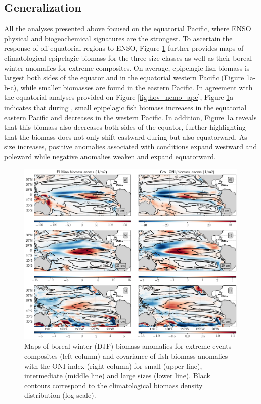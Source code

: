 \subsection{Generalization}

All the analyses presented above focused on the equatorial Pacific, where ENSO physical and biogeochemical signatures are the strongest. To ascertain the response of off equatorial regions to ENSO,  Figure \ref{fig:mean_ond97_ape} further provides maps of climatological epipelagic biomass for the three size classes as well as their boreal winter anomalies for extreme \nino{} composites.  On average, epipelagic fish biomass is largest both sides of the equator and in the equatorial western Pacific (Figure \ref{fig:mean_ond97_ape}a-b-c), while smaller biomasses  are found in the eastern Pacific. In agreement with the equatorial analyses provided on Figure \ref{fig:hov_nemo_ape}, Figure \ref{fig:mean_ond97_ape}a indicates that during \nino{}, small epipelagic fish biomass increases in the equatorial eastern Pacific and decreases in the western Pacific. In addition, Figure \ref{fig:mean_ond97_ape}a reveals that this biomass also decreases both sides of the equator, further highlighting that the biomass does not only shift eastward during \nino{} but also equatorward.
As size increases, positive anomalies associated with \nino{} conditions expand westward and poleward while negative anomalies weaken and expand equatorward. 

\begin{figure}[h!tp]
	\centering
	\includegraphics[scale=0.4]{figs/map_mean_anom_OND_97.png}	
	\caption{Maps of boreal winter (DJF) biomass anomalies for extreme \nino{} events composites (left column) and covariance of fish biomass anomalies with the ONI index (right column) for small (upper line), intermediate (middle line) and large sizes (lower line). Black contours correspond to the climatological biomass density distribution (log-scale).}	
	\label{fig:mean_ond97_ape}
\end{figure}


